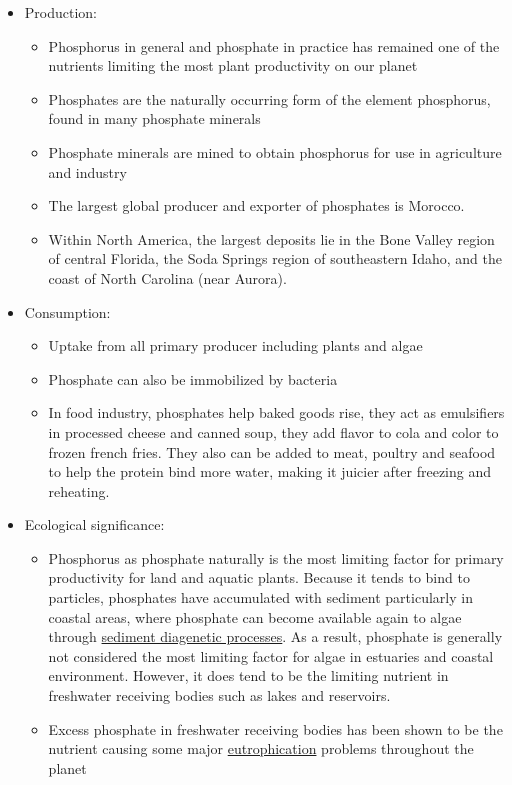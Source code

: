 \documentclass[]{book}
\providecommand{\tightlist}{%
  \setlength{\itemsep}{0pt}\setlength{\parskip}{0pt}}
\theoremstyle{definition}
\theoremstyle{definition}
\theoremstyle{definition}
\theoremstyle{remark}
\begin{document}
\begin{itemize}
\tightlist
\item
  Production:

  \begin{itemize}
  \tightlist
  \item
    Phosphorus in general and phosphate in practice has remained one of
    the nutrients limiting the most plant productivity on our planet
  \item
    Phosphates are the naturally occurring form of the element
    phosphorus, found in many phosphate minerals
  \item
    Phosphate minerals are mined to obtain phosphorus for use in
    agriculture and industry
  \item
    The largest global producer and exporter of phosphates is Morocco.
  \item
    Within North America, the largest deposits lie in the Bone Valley
    region of central Florida, the Soda Springs region of southeastern
    Idaho, and the coast of North Carolina (near Aurora).
  \end{itemize}
\item
  Consumption:

  \begin{itemize}
  \tightlist
  \item
    Uptake from all primary producer including plants and algae
  \item
    Phosphate can also be immobilized by bacteria
  \item
    In food industry, phosphates help baked goods rise, they act as
    emulsifiers in processed cheese and canned soup, they add flavor to
    cola and color to frozen french fries. They also can be added to
    meat, poultry and seafood to help the protein bind more water,
    making it juicier after freezing and reheating.
  \end{itemize}
\item
  Ecological significance:

  \begin{itemize}
  \tightlist
  \item
    Phosphorus as phosphate naturally is the most limiting factor for
    primary productivity for land and aquatic plants. Because it tends
    to bind to particles, phosphates have accumulated with sediment
    particularly in coastal areas, where phosphate can become available
    again to algae through
    \protect\hyperlink{sediment_diagenesis}{sediment diagenetic
    processes}. As a result, phosphate is generally not considered the
    most limiting factor for algae in estuaries and coastal environment.
    However, it does tend to be the limiting nutrient in freshwater
    receiving bodies such as lakes and reservoirs.
  \item
    Excess phosphate in freshwater receiving bodies has been shown to be
    the nutrient causing some major
    \protect\hyperlink{eutrophication}{eutrophication} problems
    throughout the planet
  \end{itemize}
\end{itemize}
\end{document}
